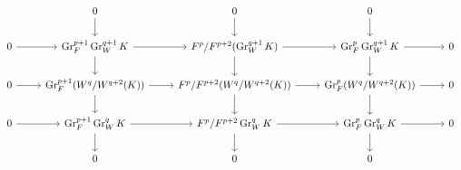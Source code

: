 \documentclass[crop,dvisvgm]{standalone}
\begin{document}
\[\begin {tikzcd}
          & 0 \dar 
          & 0 \dar 
          & 0 \dar 
        \\0 \rar 
          & \operatorname {Gr}_F^{p+1}\operatorname {Gr}_W^{q+1}K \rar  \dar 
          & F^p/F^{p+2}(\operatorname {Gr}_W^{q+1}K) \rar  \dar 
          & \operatorname {Gr}_F^p\operatorname {Gr}_W^{q+1}K \rar  \dar 
          & 0
        \\0 \rar 
          & \operatorname {Gr}_F^{p+1}(W^q/W^{q+2}(K)) \rar  \dar 
          & F^p/F^{p+2}(W^q/W^{q+2}(K)) \rar  \dar 
          & \operatorname {Gr}_F^p(W^q/W^{q+2}(K)) \rar  \dar 
          & 0
        \\0 \rar 
          & \operatorname {Gr}_F^{p+1}\operatorname {Gr}_W^q K \rar  \dar 
          & F^p/F^{p+2}\operatorname {Gr}_W^q K \rar  \dar 
          & \operatorname {Gr}_F^p\operatorname {Gr}_W^q K \rar  \dar 
          & 0
        \\& 0
          & 0
          & 0
        \end {tikzcd}\]
\end{document}
